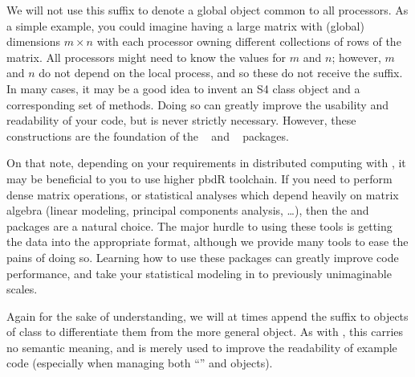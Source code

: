 We will not use this suffix to denote a global object common to all processors.  As a simple example, you could imagine having a large matrix with (global) dimensions $m\times n$ with each processor owning different collections of rows of the matrix.  All processors might need to know the values for $m$ and $n$; however, $m$ and $n$ do not depend on the local process, and so these do not receive the  suffix.  In many cases, it may be a good idea to invent an S4 class object and a corresponding set of methods.  Doing so can greatly improve the usability and readability of your code, but is never strictly necessary.  However, these constructions are the foundation of the ~\citep{Schmidt2012pbdBASEpackage} and
~\citep{Schmidt2012pbdDMATpackage} packages.

On that note, depending on your requirements in distributed computing with , it may be beneficial to you to use higher pbdR toolchain.  If you need to perform dense matrix operations, or statistical analyses which depend heavily on matrix algebra (linear modeling, principal components analysis, \dots), then the  and  packages are a natural choice.  The major hurdle to using these tools is getting the data into the appropriate  format, although we provide many tools to ease the pains of doing so.  Learning how to use these packages can greatly improve code performance, and take your statistical modeling in  to previously unimaginable scales.

Again for the sake of understanding, we will at times append the suffix  to objects of class  to differentiate them from the more general  object.  As with , this carries no semantic meaning, and is merely used to improve the readability of example code (especially when managing both ``'' and  objects).

